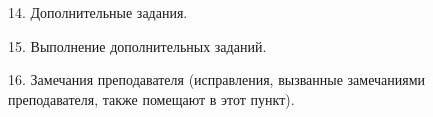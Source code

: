 \documentclass[12pt]{article}
\begin{document}
\begin{flushleft}
    14. Дополнительные задания.
\end{flushleft}

\begin{flushleft}
    15. Выполнение дополнительных заданий.
\end{flushleft}

\begin{flushleft}
    16. Замечания преподавателя (исправления, вызванные замечаниями преподавателя, также помещают в этот пункт).
\end{flushleft}
\end{document}
